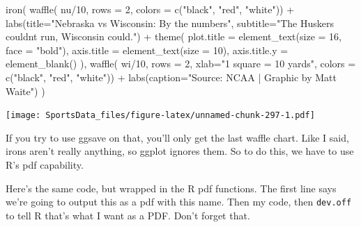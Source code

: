 \documentclass[
]{book}
\newenvironment{Shaded}{\begin{snugshade}}{\end{snugshade}}
\newcommand{\AttributeTok}[1]{\textcolor[rgb]{0.77,0.63,0.00}{#1}}
\newcommand{\DecValTok}[1]{\textcolor[rgb]{0.00,0.00,0.81}{#1}}
\newcommand{\FunctionTok}[1]{\textcolor[rgb]{0.00,0.00,0.00}{#1}}
\newcommand{\NormalTok}[1]{#1}
\newcommand{\SpecialCharTok}[1]{\textcolor[rgb]{0.00,0.00,0.00}{#1}}
\newcommand{\StringTok}[1]{\textcolor[rgb]{0.31,0.60,0.02}{#1}}
\begin{document}
\begin{Shaded}
\begin{Highlighting}[]
\FunctionTok{iron}\NormalTok{(}
 \FunctionTok{waffle}\NormalTok{(}
\NormalTok{   nu}\SpecialCharTok{/}\DecValTok{10}\NormalTok{, }
   \AttributeTok{rows =} \DecValTok{2}\NormalTok{, }
   \AttributeTok{colors =} \FunctionTok{c}\NormalTok{(}\StringTok{"black"}\NormalTok{, }\StringTok{"red"}\NormalTok{, }\StringTok{"white"}\NormalTok{)) }\SpecialCharTok{+} 
   \FunctionTok{labs}\NormalTok{(}\AttributeTok{title=}\StringTok{"Nebraska vs Wisconsin: By the numbers"}\NormalTok{, }\AttributeTok{subtitle=}\StringTok{"The Huskers couldn\textquotesingle{}t run, Wisconsin could."}\NormalTok{) }\SpecialCharTok{+} 
   \FunctionTok{theme}\NormalTok{(}
    \AttributeTok{plot.title =} \FunctionTok{element\_text}\NormalTok{(}\AttributeTok{size =} \DecValTok{16}\NormalTok{, }\AttributeTok{face =} \StringTok{"bold"}\NormalTok{),}
    \AttributeTok{axis.title =} \FunctionTok{element\_text}\NormalTok{(}\AttributeTok{size =} \DecValTok{10}\NormalTok{),}
    \AttributeTok{axis.title.y =} \FunctionTok{element\_blank}\NormalTok{()}
\NormalTok{  ),}
 \FunctionTok{waffle}\NormalTok{(}
\NormalTok{   wi}\SpecialCharTok{/}\DecValTok{10}\NormalTok{, }
   \AttributeTok{rows =} \DecValTok{2}\NormalTok{, }
   \AttributeTok{xlab=}\StringTok{"1 square = 10 yards"}\NormalTok{, }
   \AttributeTok{colors =} \FunctionTok{c}\NormalTok{(}\StringTok{"black"}\NormalTok{, }\StringTok{"red"}\NormalTok{, }\StringTok{"white"}\NormalTok{)) }\SpecialCharTok{+} \FunctionTok{labs}\NormalTok{(}\AttributeTok{caption=}\StringTok{"Source: NCAA | Graphic by Matt Waite"}\NormalTok{)}
\NormalTok{) }
\end{Highlighting}
\end{Shaded}

\texttt{[image: SportsData\_files/figure-latex/unnamed-chunk-297-1.pdf]}

If you try to use ggsave on that, you'll only get the last waffle chart. Like I said, irons aren't really anything, so ggplot ignores them. So to do this, we have to use R's pdf capability.

Here's the same code, but wrapped in the R pdf functions. The first line says we're going to output this as a pdf with this name. Then my code, then \texttt{dev.off} to tell R that's what I want as a PDF. Don't forget that.
\end{document}
